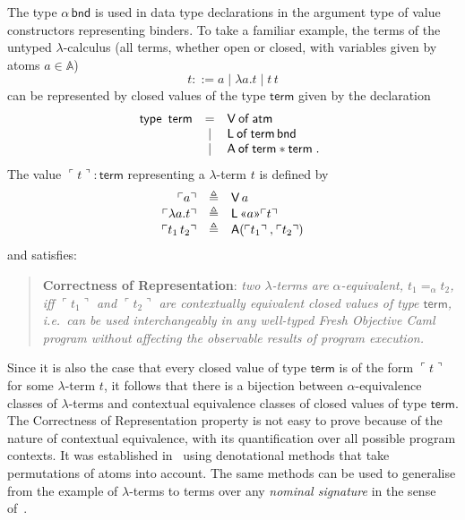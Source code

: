 \documentclass{LMCS}
\theoremstyle{plain}
\theoremstyle{definition}
\newcommand{\aeq}{=_{\alpha}}
\newcommand{\ALT}{\mathrel{\kw{|}}}
\newcommand{\atm}[1][a]{#1}
\newcommand{\ATM}{\kw{atm}}
\newcommand{\Atom}{\mathbb{A}}
\newcommand{\BINDTY}{\kw{bnd}}
\newcommand{\BINDVAL}[2]{\mathopen{\text{\normalfont\guillemotleft}}#1
  \mathclose{\text{\normalfont\guillemotright}}#2}
\newcommand{\CON}[1][C]{\kw{#1}}
\newcommand{\defeq}{\triangleq}
\newcommand{\EQ}{\mathbin{\kw{=}}}
\newcommand{\kw}[1]{\mathsf{#1}}
\newcommand{\OF}{\mathbin{\kw{of}}}
\newcommand{\OFTY}{\mathrel{\kw{:}}}
\newcommand{\PRODTY}{\mathbin{\kw{*}}}
\newcommand{\rep}[1]{\ulcorner#1\urcorner}
\newcommand{\TERM}{\kw{term}}
\newcommand{\TYPE}{\kw{type}}
\newcommand{\TYVAR}{\alpha}
\begin{document}
The type $\TYVAR\,\BINDTY$ is used in data type declarations in the
argument type of value constructors representing binders. To take a
familiar example, the terms of the untyped $\lambda$-calculus (all
terms, whether open or closed, with variables given by atoms
$\atm\in\Atom$)
\[
t ::= \atm \mid \lambda\atm. t \mid t\,t
\]
can be represented by closed values of the type $\TERM$
given by the declaration
\begin{equation}
  \label{eq:10}
  \TYPE
  \begin{array}[t]{rcl}
    \TERM & \EQ  & \CON[V] \OF \ATM\\
    & \ALT & \CON[L] \OF \TERM\,\BINDTY\\
    & \ALT & \CON[A] \OF \TERM\PRODTY\TERM\;.
  \end{array}  
\end{equation}
The value $\rep{t}\OFTY\TERM$ representing a $\lambda$-term $t$ is
defined by
\begin{equation}
  \label{eq:11}
  \begin{array}[c]{rcl}
    \rep{\atm} &\defeq& \CON[V]\,\atm\\
    \rep{\lambda\atm.t} &\defeq& \CON[L]\,\BINDVAL{\atm}{\rep{t}}\\
    \rep{t_1\,t_2} &\defeq& \CON[A]\PAIR{\rep{t_1}}{\rep{t_2}}
  \end{array}
\end{equation}
and satisfies:
\begin{quote}
  \textbf{Correctness of Representation}: \emph{two $\lambda$-terms
    are $\alpha$-equivalent, $t_1\aeq t_2$, iff $\rep{t_1}$ and
    $\rep{t_2}$ are contextually equivalent closed values of type
    $\TERM$, i.e.~can be used interchangeably in any well-typed Fresh
    Objective Caml program without affecting the observable results of
    program execution.}
\end{quote}
Since it is also the case that every closed value of type $\TERM$ is
of the form $\rep{t}$ for some $\lambda$-term $t$, it follows that
there is a bijection between $\alpha$-equivalence classes of
$\lambda$-terms and contextual equivalence classes of closed values of
type $\TERM$.  The Correctness of Representation property is not easy
to prove because of the nature of contextual equivalence, with its
quantification over all possible program contexts. It was established
in~\cite{ShinwellMR:freafp,PittsAM:monsf} using denotational methods
that take permutations of atoms into account. The same methods can be
used to generalise from the example of $\lambda$-terms to terms over
any \emph{nominal signature} in the sense of~\cite{PittsAM:nomu-jv}.
\end{document}
